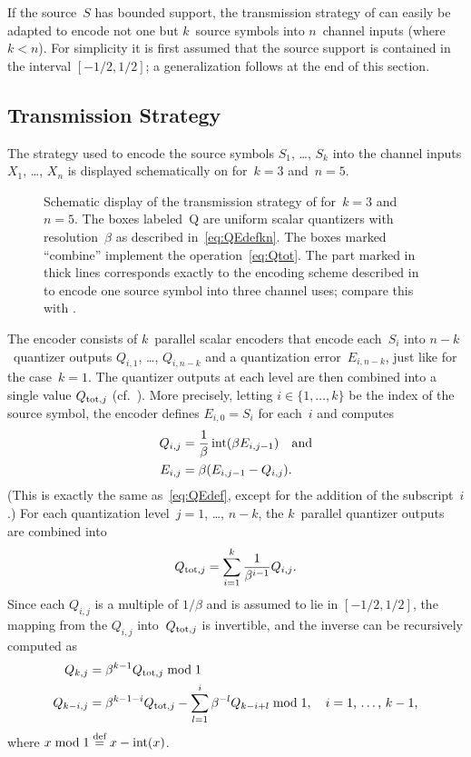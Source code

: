 If the source~$S$ has bounded support, the transmission strategy of
 can easily be adapted to encode not one but $k$~source
symbols into $n$~channel inputs (where $k < n$). For simplicity it is first
assumed that the source support is contained in the interval $[-1/2, 1/2]$; a
generalization follows at the end of this section.


\subsection{Transmission Strategy}

The strategy used to encode the source symbols $S_1$, \dots, $S_k$ into the
channel inputs $X_1$, \dots, $X_n$ is displayed schematically on
 for~$k=3$ and~$n=5$. 
\begin{figure}
  \begin{center}
    
  \end{center}
  \caption{Schematic display of the transmission strategy of 
  for~$k = 3$ and~$n=5$. The boxes labeled~\textsf{Q} are uniform scalar
  quantizers with resolution~$\beta$ as described in~\eqref{eq:QEdefkn}. The
  boxes marked ``combine'' implement the operation~\eqref{eq:Qtot}. The
  part marked in thick lines corresponds exactly to the encoding scheme
  described in  to encode one source symbol into three
  channel uses; compare this with .}
  \label{fig:knencoding}
\end{figure}
The encoder consists of $k$~parallel scalar encoders that encode each~$S_i$ into
$n-k$~quantizer outputs $Q_{i,1}$, \dots, $Q_{i,n-k}$ and a quantization
error~$E_{i,n-k}$, just like for the case~$k=1$. The quantizer outputs at each
level are then combined into a single value $Q_{\operatorname{tot},j}$
(cf.~). More precisely, letting $i \in \{1, \dots, k\}$ be
the index of the source symbol, the encoder defines $E_{i,0} = S_i$ for
each~$i$ and computes
\begin{align}
  Q_{i,j} &= \frac{1}{\beta} \operatorname{int}(\beta E_{i,j-1}) \quad\text{and} \nonumber \\
  E_{i,j} &= \beta(E_{i,j-1} - Q_{i,j}). \label{eq:QEdefkn}
\end{align}
(This is exactly the same as~\eqref{eq:QEdef}, except for the addition of the
subscript~$i$.) For each quantization level~$j = 1$, \dots, $n-k$, the
$k$~parallel quantizer outputs are combined into
\begin{equation}
  \label{eq:Qtot}
  Q_{\operatorname{tot},j} = \sum_{i=1}^k \frac{1}{\beta^{i-1}} Q_{i,j}.
\end{equation}
Since each $Q_{i,j}$ is a multiple of $1/\beta$ and is assumed to lie in $[-1/2,
1/2]$, the mapping from the $Q_{i,j}$ into~$Q_{\operatorname{tot},j}$ is invertible, and the
inverse can be recursively computed as
\begin{align}
  Q_{k,j} &= \beta^{k-1} Q_{\operatorname{tot},j} \bmod 1 \nonumber \\
  Q_{k-i,j} &= \beta^{k-1-i} Q_{\operatorname{tot},j} - \sum_{l = 1}^i \beta^{-l} Q_{k - i +
  l} \bmod 1, \quad\text{$i = 1$, \dots, $k-1$,} 
  \label{eq:Qtotinv}
\end{align}
where $x \bmod 1 \stackrel{\text{def}}{=} x - \operatorname{int}(x)$.

